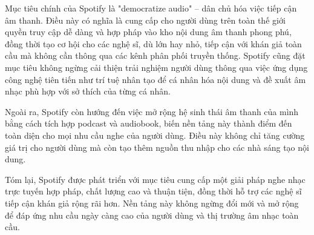 Mục tiêu chính của Spotify là "democratize audio" – dân chủ hóa việc tiếp cận âm thanh. Điều này có nghĩa là cung cấp cho người dùng trên toàn thế giới quyền truy cập dễ dàng và hợp pháp vào kho nội dung âm thanh phong phú, đồng thời tạo cơ hội cho các nghệ sĩ, dù lớn hay nhỏ, tiếp cận với khán giả toàn cầu mà không cần thông qua các kênh phân phối truyền thống. Spotify cũng đặt mục tiêu không ngừng cải thiện trải nghiệm người dùng thông qua việc ứng dụng công nghệ tiên tiến như trí tuệ nhân tạo để cá nhân hóa nội dung và đề xuất âm nhạc phù hợp với sở thích của từng cá nhân. 

Ngoài ra, Spotify còn hướng đến việc mở rộng hệ sinh thái âm thanh của mình bằng cách tích hợp podcast và audiobook, biến nền tảng này thành điểm đến toàn diện cho mọi nhu cầu nghe của người dùng. Điều này không chỉ tăng cường giá trị cho người dùng mà còn tạo thêm nguồn thu nhập cho các nhà sáng tạo nội dung. 

Tóm lại, Spotify được phát triển với mục tiêu cung cấp một giải pháp nghe nhạc trực tuyến hợp pháp, chất lượng cao và thuận tiện, đồng thời hỗ trợ các nghệ sĩ tiếp cận khán giả rộng rãi hơn. Nền tảng này không ngừng đổi mới và mở rộng để đáp ứng nhu cầu ngày càng cao của người dùng và thị trường âm nhạc toàn cầu.